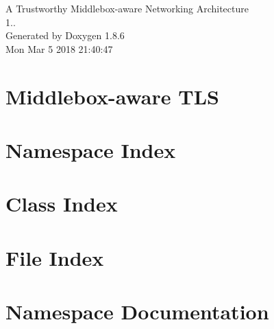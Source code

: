 \documentclass[twoside]{book}
\newcommand{\clearemptydoublepage}{%
  \newpage{\pagestyle{empty}\cleardoublepage}%
}
\begin{document}
\hypersetup{pageanchor=false}
\begin{titlepage}
\vspace*{7cm}
\begin{center}%
{\Large A Trustworthy Middlebox-\/aware Networking Architecture \\[1ex]\large 1.. }\\
\vspace*{1cm}
{\large Generated by Doxygen 1.8.6}\\
\vspace*{0.5cm}
{\small Mon Mar 5 2018 21:40:47}\\
\end{center}
\end{titlepage}
\clearemptydoublepage
\tableofcontents
\clearemptydoublepage
{}
\hypersetup{pageanchor=true}

\chapter{Middlebox-\/aware T\-L\-S}
\label{md_README}
\hypertarget{md_README}{}

\chapter{Namespace Index}

\chapter{Class Index}

\chapter{File Index}

\chapter{Namespace Documentation}




















\end{document}
